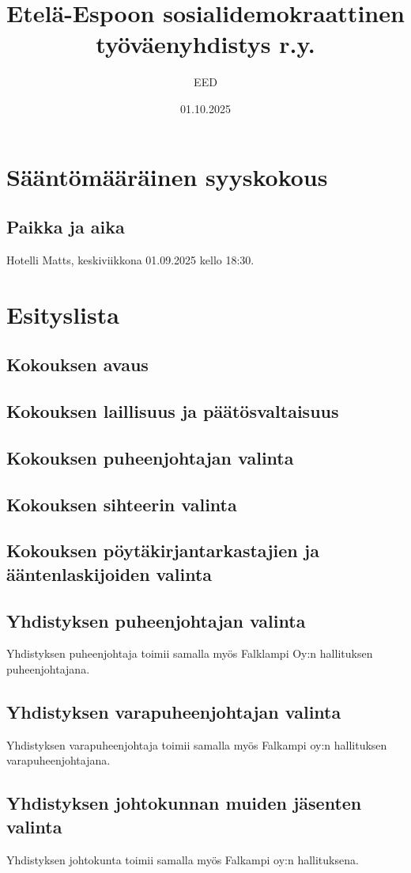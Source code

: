 \documentclass[a4paper,12pt]{article}
\title{Etelä-Espoon sosialidemokraattinen työväenyhdistys r.y.}
\author{EED}
\date{01.10.2025}
\begin{document}
\maketitle
\tableofcontents
\section*{Sääntömääräinen syyskokous}
\subsection*{Paikka ja aika}
Hotelli Matts, keskiviikkona 01.09.2025 kello 18:30.
\section*{Esityslista}
\subsection{Kokouksen avaus}
\subsection{Kokouksen laillisuus ja päätösvaltaisuus}
\subsection{Kokouksen puheenjohtajan valinta}
\subsection{Kokouksen sihteerin valinta}
\subsection{Kokouksen pöytäkirjantarkastajien ja ääntenlaskijoiden valinta}
\subsection{Yhdistyksen puheenjohtajan valinta}
Yhdistyksen puheenjohtaja toimii samalla myös Falklampi Oy:n hallituksen puheenjohtajana.
\subsection{Yhdistyksen varapuheenjohtajan valinta}
Yhdistyksen varapuheenjohtaja toimii samalla myös Falkampi oy:n hallituksen varapuheenjohtajana.
\subsection{Yhdistyksen johtokunnan muiden jäsenten valinta}
Yhdistyksen johtokunta toimii samalla myös Falkampi oy:n hallituksena.
\end{document}
